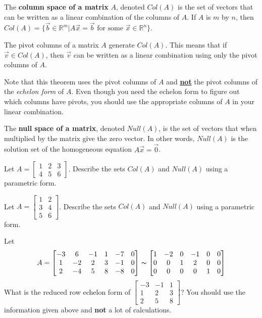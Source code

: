 \begin{definition} The \textbf{column space of a matrix} $A$, denoted $Col(A)$ is the set of vectors that can be written as a linear combination of the columns of $A$. If $A$ is $m$ by $n$, then $Col(A)=\{\vec{b} \in \mathbb{R}^m | A\vec{x} =\vec{b} \mbox{ for some } \vec{x} \in \mathbb{R}^n \}$.
\end{definition}

\begin{theorem} The pivot columns of a matrix $A$ generate $Col(A)$. This means that if $\vec{v} \in Col(A)$, then $\vec{v}$ can be written as a linear combination using only the pivot columns of $A$.
\end{theorem}
Note that this theorem uses the pivot columns of $A$ and \underline{\textbf{not}} the pivot columns of the \emph{echelon form} of $A$. Even though you need the echelon form to figure out which columns have pivots, you should use the appropriate columns of $A$ in your linear combination.


\begin{definition} The \textbf{null space of a matrix}, denoted $Null(A)$, is the set of vectors that when multiplied by the matrix give the zero vector. In other words, $Null(A)$ is the solution set of the homogeneous equation $A\vec{x}=\vec{0}$.
\end{definition}

\bq Let $A=\begin{bmatrix} 1&2&3 \\4&5&6 \end{bmatrix}$. Describe the sets $Col(A)$ and $Null(A)$ using a parametric form.
\eq

\bq Let $A=\begin{bmatrix} 1&2\\ 3&4\\5&6 \end{bmatrix}$. Describe the sets $Col(A)$ and $Null(A)$ using a parametric form.
\eq

\bq Let $$A=\begin{bmatrix} -3&6&-1&1&-7&0 \\1&-2&2&3&-1&0 \\2&-4&5&8&-8&0 \end{bmatrix}  \thicksim \begin{bmatrix} 1&-2&0&-1&0&0\\0&0&1&2&0&0 \\ 0&0&0&0&1&0 \end{bmatrix}$$
What is the reduced row echelon form of $\begin{bmatrix} -3&-1&1 \\1&2&3 \\2&5&8\end{bmatrix}$? You should use the information given above and \textbf{not} a lot of calculations.
\eq

